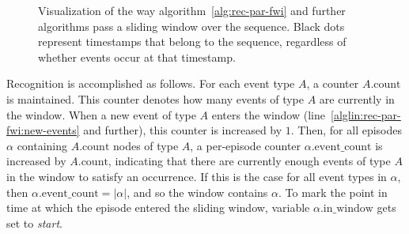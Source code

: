 \begin{figure}
\centering

\caption{Visualization of the way algorithm~\ref{alg:rec-par-fwi} and further algorithms pass a sliding window over the sequence. Black dots represent timestamps that belong to the sequence, regardless of whether events occur at that timestamp.}
\label{fig:sliding-window}
\end{figure}

Recognition is accomplished as follows. For each event type $ A $, a counter $ A \text{.count} $ is maintained. This counter denotes how many events of type $ A $ are currently in the window. When a new event of type $ A $ enters the window (line~\ref{alglin:rec-par-fwi:new-events} and further), this counter is increased by $ 1 $. Then, for all episodes $ \alpha $ containing $ A \text{.count} $ nodes of type $ A $, a per-episode counter $ \alpha \text{.event\_count} $ is increased by $ A \text{.count} $, indicating that there are currently enough events of type $ A $ in the window to satisfy an occurrence. If this is the case for all event types in $ \alpha $, then $ \alpha \text{.event\_count} = | \alpha | $, and so the window contains $ \alpha $. To mark the point in time at which the episode entered the sliding window, variable $ \alpha \text{.in\_window} $ gets set to \emph{start}.

